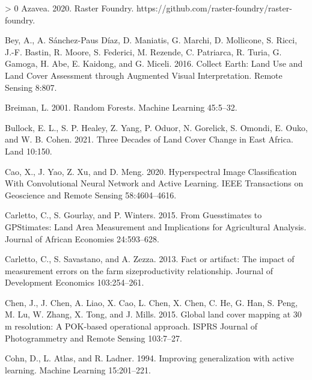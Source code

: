 \documentclass[11pt,a4paper]{article}
\newlength{\cslhangindent}
\newenvironment{CSLReferences}[3] %
 {%
  \setlength{\parindent}{0pt}
  \ifodd #1 \everypar{\setlength{\hangindent}{\cslhangindent}}\ignorespaces\fi
  \ifnum #2 > 0
  \setlength{\parskip}{#2\baselineskip}
  \fi
 }%
 {}
\begin{document}
\hypertarget{refs}{}
\begin{CSLReferences}{1}{0}
\leavevmode\hypertarget{ref-azaveaRasterFoundry2020}{}%
Azavea. 2020. Raster {Foundry}.
https://github.com/raster-foundry/raster-foundry.

\leavevmode\hypertarget{ref-BeyCollectEarthLand2016}{}%
Bey, A., A. Sánchez-Paus Díaz, D. Maniatis, G. Marchi, D. Mollicone, S.
Ricci, J.-F. Bastin, R. Moore, S. Federici, M. Rezende, C. Patriarca, R.
Turia, G. Gamoga, H. Abe, E. Kaidong, and G. Miceli. 2016. Collect
{Earth}: {Land Use} and {Land Cover Assessment} through {Augmented
Visual Interpretation}. Remote Sensing 8:807.

\leavevmode\hypertarget{ref-BreimanRandomForests2001}{}%
Breiman, L. 2001. Random {Forests}. Machine Learning 45:5--32.

\leavevmode\hypertarget{ref-bullockThreeDecadesLand2021}{}%
Bullock, E. L., S. P. Healey, Z. Yang, P. Oduor, N. Gorelick, S. Omondi,
E. Ouko, and W. B. Cohen. 2021. Three {Decades} of {Land Cover Change}
in {East Africa}. Land 10:150.

\leavevmode\hypertarget{ref-caoHyperspectralImageClassification2020}{}%
Cao, X., J. Yao, Z. Xu, and D. Meng. 2020. Hyperspectral {Image
Classification With Convolutional Neural Network} and {Active Learning}.
IEEE Transactions on Geoscience and Remote Sensing 58:4604--4616.

\leavevmode\hypertarget{ref-CarlettoGuesstimatesGPStimatesLand2015}{}%
Carletto, C., S. Gourlay, and P. Winters. 2015. From {Guesstimates} to
{GPStimates}: {Land Area Measurement} and {Implications} for
{Agricultural Analysis}. Journal of African Economies 24:593--628.

\leavevmode\hypertarget{ref-CarlettoFactartifactimpact2013}{}%
Carletto, C., S. Savastano, and A. Zezza. 2013. Fact or artifact: {The}
impact of measurement errors on the farm size{}productivity
relationship. Journal of Development Economics 103:254--261.

\leavevmode\hypertarget{ref-ChenGloballandcover2015}{}%
Chen, J., J. Chen, A. Liao, X. Cao, L. Chen, X. Chen, C. He, G. Han, S.
Peng, M. Lu, W. Zhang, X. Tong, and J. Mills. 2015. Global land cover
mapping at 30 m resolution: {A POK}-based operational approach. ISPRS
Journal of Photogrammetry and Remote Sensing 103:7--27.

\leavevmode\hypertarget{ref-cohnImprovingGeneralizationActive1994}{}%
Cohn, D., L. Atlas, and R. Ladner. 1994. Improving generalization with
active learning. Machine Learning 15:201--221.


\end{CSLReferences}
\end{document}
